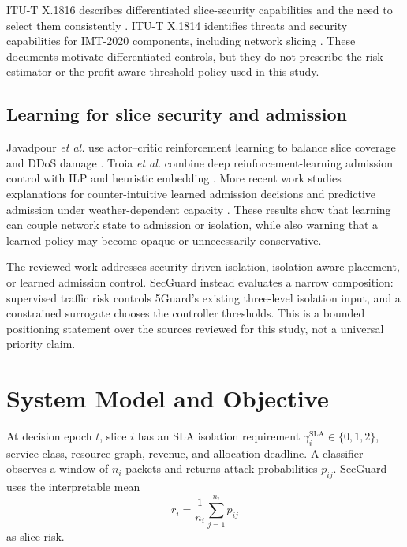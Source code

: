 \documentclass[conference]{IEEEtran}
\begin{document}
ITU-T X.1816 describes differentiated slice-security capabilities and the need
to select them consistently \cite{itutx1816}. ITU-T X.1814 identifies threats
and security capabilities for IMT-2020 components, including network slicing
\cite{itutx1814}. These documents motivate differentiated controls, but they do
not prescribe the risk estimator or the profit-aware threshold policy used in
this study.

\subsection{Learning for slice security and admission}
Javadpour \emph{et al.} use actor--critic reinforcement learning to balance
slice coverage and DDoS damage \cite{javadpour2023isolation}. Troia \emph{et
al.} combine deep reinforcement-learning admission control with ILP and
heuristic embedding \cite{troia2022admission}. More recent work studies
explanations for counter-intuitive learned admission decisions
\cite{asdikian2025verifying} and predictive admission under weather-dependent
capacity \cite{jacoby2026aware}. These results show that learning can couple
network state to admission or isolation, while also warning that a learned
policy may become opaque or unnecessarily conservative.

The reviewed work addresses security-driven isolation, isolation-aware
placement, or learned admission control. SecGuard instead evaluates a narrow
composition: supervised traffic risk controls 5Guard's existing three-level
isolation input, and a constrained surrogate chooses the controller thresholds.
This is a bounded positioning statement over the sources reviewed for this
study, not a universal priority claim.

\section{System Model and Objective}
At decision epoch $t$, slice $i$ has an SLA isolation requirement
$\gamma_i^{\mathrm{SLA}}\in\{0,1,2\}$, service class, resource graph, revenue,
and allocation deadline. A classifier observes a window of $n_i$ packets and
returns attack probabilities $p_{ij}$. SecGuard uses the interpretable mean
\begin{equation}
 r_i = \frac{1}{n_i}\sum_{j=1}^{n_i}p_{ij}
 \label{eq:risk}
\end{equation}
as slice risk.
\end{document}
